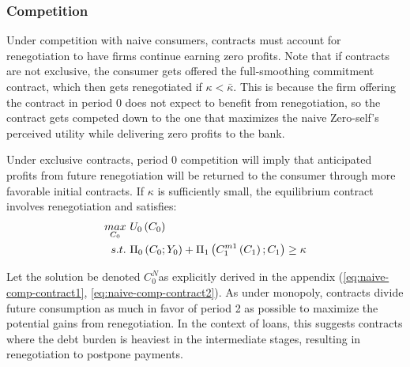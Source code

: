 \documentclass[11pt,english]{article}
\theoremstyle{plain}
\theoremstyle{definition}
\begin{document}
\subsubsection{Competition}

Under competition with naive consumers, contracts must account for
renegotiation to have firms continue earning zero profits. Note that if contracts are not exclusive, the consumer gets offered
the full-smoothing commitment contract, which then gets renegotiated
if $\kappa<\bar{\kappa}$. This is because the firm offering the contract
in period 0 does not expect to benefit from renegotiation, so the
contract gets competed down to the one that maximizes the naive Zero-self's
perceived utility while delivering zero profits to the bank.

Under exclusive contracts, period 0 competition will imply that anticipated profits from future renegotiation
will be returned to the consumer through more favorable initial contracts.
If $\kappa$ is sufficiently small, the equilibrium contract involves
renegotiation and satisfies: 
\begin{align}
\underset{C_{0}}{\mbox{\ensuremath{max}}} & \ U_{0}\left(C_{0}\right)\\
s.t. & \ \Pi_{0}\left(C_{0};Y_{0}\right)+\Pi_{1}\left(C_{1}^{m1}\left(C_{1}\right);C_{1}\right)\geq\kappa
\end{align}

Let the solution be denoted $C_{0}^{N}$as explicitly derived
in the appendix (\ref{eq:naive-comp-contract1},  \ref{eq:naive-comp-contract2}).
As under monopoly, contracts divide future consumption as much in
favor of period 2 as possible to maximize the potential gains
from renegotiation. In the context of loans, this suggests contracts
where the debt burden is heaviest in the intermediate stages, resulting
in renegotiation to postpone payments.
\end{document}
